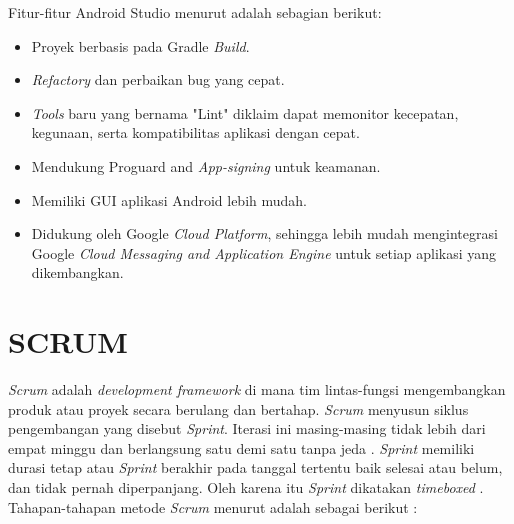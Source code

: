 \par Fitur-fitur Android Studio menurut \citep{puspitasari2020} adalah sebagian berikut:
\begin{itemize}
\item Proyek berbasis pada Gradle \textit{Build}.
\item \textit{Refactory} dan perbaikan bug yang cepat.
\item \textit{Tools} baru yang bernama "Lint" diklaim dapat memonitor kecepatan, kegunaan, serta kompatibilitas aplikasi dengan cepat.
\item Mendukung Proguard and \textit{App-signing} untuk keamanan.
\item Memiliki GUI aplikasi Android lebih mudah.
\item Didukung oleh Google \textit{Cloud Platform}, sehingga lebih mudah mengintegrasi Google \textit{Cloud Messaging and Application Engine} untuk setiap aplikasi yang dikembangkan.
\end{itemize}

\section{SCRUM}
\textit{Scrum} adalah \textit{development framework} di mana tim lintas-fungsi mengembangkan produk atau proyek secara berulang dan bertahap. \textit{Scrum} menyusun siklus pengembangan yang disebut \textit{Sprint}. Iterasi ini masing-masing tidak lebih dari empat minggu dan berlangsung satu demi satu tanpa jeda \citep{deemer2012lightweight}. \textit{Sprint} memiliki durasi tetap atau \textit{Sprint} berakhir pada tanggal tertentu baik selesai atau belum, dan tidak pernah diperpanjang. Oleh karena itu \textit{Sprint} dikatakan \textit{timeboxed} \citep{schwaber2011scrum}. Tahapan-tahapan metode \textit{Scrum} menurut \citep{schwaber2011scrum} adalah sebagai berikut :

